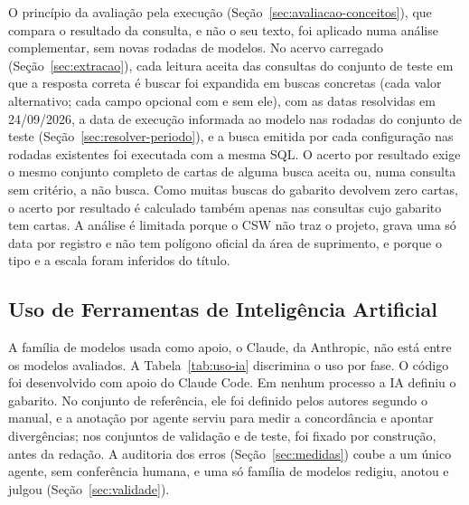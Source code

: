 O princípio da avaliação pela execução (Seção~\ref{sec:avaliacao-conceitos}), que compara o resultado da consulta, e não o seu texto, foi aplicado numa análise complementar, sem novas rodadas de modelos. No acervo carregado (Seção~\ref{sec:extracao}), cada leitura aceita das consultas do conjunto de teste em que a resposta correta é buscar foi expandida em buscas concretas (cada valor alternativo; cada campo opcional com e sem ele), com as datas resolvidas em 24/09/2026, a data de execução informada ao modelo nas rodadas do conjunto de teste (Seção~\ref{sec:resolver-periodo}), e a busca emitida por cada configuração nas rodadas existentes foi executada com a mesma SQL. O acerto por resultado exige o mesmo conjunto completo de cartas de alguma busca aceita ou, numa consulta sem critério, a não busca. Como muitas buscas do gabarito devolvem zero cartas, o acerto por resultado é calculado também apenas nas consultas cujo gabarito tem cartas. A análise é limitada porque o CSW não traz o projeto, grava uma só data por registro e não tem polígono oficial da área de suprimento, e porque o tipo e a escala foram inferidos do título.

\subsection{Uso de Ferramentas de Inteligência Artificial}
\label{sec:uso-ia}

A família de modelos usada como apoio, o Claude, da Anthropic, não está entre os modelos avaliados. A Tabela~\ref{tab:uso-ia} discrimina o uso por fase. O código foi desenvolvido com apoio do Claude Code. Em nenhum processo a IA definiu o gabarito. No conjunto de referência, ele foi definido pelos autores segundo o manual, e a anotação por agente serviu para medir a concordância e apontar divergências; nos conjuntos de validação e de teste, foi fixado por construção, antes da redação. A auditoria dos erros (Seção~\ref{sec:medidas}) coube a um único agente, sem conferência humana, e uma só família de modelos redigiu, anotou e julgou (Seção~\ref{sec:validade}).

